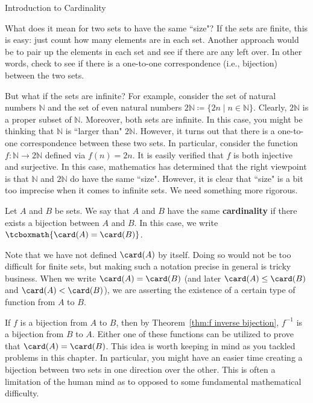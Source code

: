 \begin{section}{Introduction to Cardinality}

What does it mean for two sets to have the same ``size"?  If the sets are finite, this is easy: just count how many elements are in each set.  Another approach would be to pair up the elements in each set and see if there are any left over.  In other words, check to see if there is a one-to-one correspondence (i.e., bijection) between the two sets.  

But what if the sets are infinite?  For example, consider the set of natural numbers $\mathbb{N}$ and the set of even natural numbers $2\mathbb{N}\coloneqq \{2n\mid n\in \mathbb{N}\}$. Clearly, $2\mathbb{N}$ is a proper subset of $\mathbb{N}$.  Moreover, both sets are infinite.  In this case, you might be thinking that $\mathbb{N}$ is ``larger than" $2\mathbb{N}$.  However, it turns out that there is a one-to-one correspondence between these two sets.  In particular, consider the function $f:\mathbb{N}\to 2\mathbb{N}$ defined via $f(n)=2n$.  It is easily verified that $f$ is both injective and surjective.  In this case, mathematics has determined that the right viewpoint is that $\mathbb{N}$ and $2\mathbb{N}$ do have the same ``size". However, it is clear that ``size" is a bit too imprecise when it comes to infinite sets. We need something more rigorous.

\begin{definition}
Let $A$ and $B$ be sets. We say that $A$ and $B$ have the same \textbf{cardinality} if there exists a bijection between $A$ and $B$. In this case, we write $\tcboxmath{\card(A)=\card(B)}$.
\end{definition}

Note that we have not defined $\card(A)$ by itself. Doing so would not be too difficult for finite sets, but making such a notation precise in general is tricky business.  When we write $\card(A)=\card(B)$ (and later $\card(A)\leq \card(B)$ and $\card(A)<\card(B)$), we are asserting the existence of a certain type of function from $A$ to $B$.

If $f$ is a bijection from $A$ to $B$, then by Theorem~\ref{thm:f inverse bijection}, $f^{-1}$ is a bijection from $B$ to $A$.  Either one of these functions can be utilized to prove that $\card(A)=\card(B)$.  This idea is worth keeping in mind as you tackled problems in this chapter.  In particular, you might have an easier time creating a bijection between two sets in one direction over the other. This is often a limitation of the human mind as to opposed to some fundamental mathematical difficulty.


\end{section}
